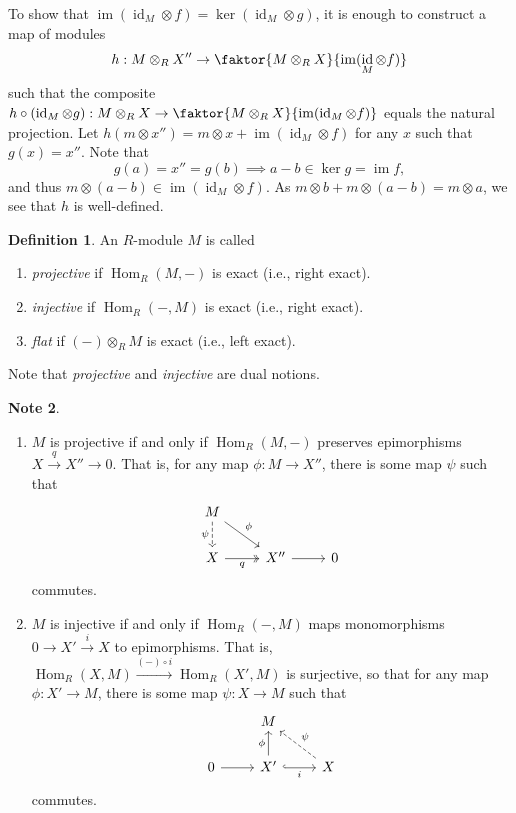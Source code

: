\documentclass[10pt,letterpaper,cm]{nupset}
\theoremstyle{definition}
\newtheorem{definition}{Definition}[subsection]
\newtheorem{note}[definition]{Note}
\theoremstyle{theorem}
\theoremstyle{remark}
\newcommand{\1}{\mathbf{1}}
\newcommand{\0}{\vec 0}
\DeclareMathOperator{\id}{\mathrm{id}}
\DeclareMathOperator{\im}{im}
\DeclareMathOperator{\Hom}{Hom}
\begin{document}
To show that $\im(\id_M \otimes f) = \ker(\id_M \otimes g)$, it is enough to construct a map of modules $$h: M \otimes_R X'' \to \faktor{M \otimes_R X}{\im(\id_M \otimes f)}$$ such that the composite $h\circ \left(\id_M \otimes g\right) : M\otimes_R X \to \faktor{M \otimes_R X}{\im(\id_M \otimes f)}$ equals the natural projection. Let $h(m\otimes x'') = m \otimes x + \im(\id_M \otimes f)$ for any $x$ such that $g(x) = x''$. Note that $$g(a) = x'' = g(b) \implies a-b \in \ker{g} = \im{f},$$ and thus $m \otimes (a-b) \in \im(\id_M \otimes f)$. As $m\otimes b + m \otimes (a-b) = m\otimes a$, we see that $h$ is well-defined.

\smallskip

\begin{definition} An $R$-module $M$ is called
\begin{enumerate}
\item \textit{projective} if $\Hom_R(M, -)$ is exact (i.e., right exact).
\item \textit{injective} if $\Hom_R(-, M)$ is exact (i.e., right exact).
\item \textit{flat} if $(-) \otimes_R M$ is exact (i.e., left exact).
\end{enumerate}
\end{definition}


Note that \textit{projective} and \textit{injective} are dual notions.


\begin{note} $ $
\begin{enumerate}
\item $M$ is projective  if and only if $\Hom_R(M, -)$ preserves epimorphisms $X \overset{q}{\longrightarrow}  X'' \to 0$. That is, for any map $\phi : M \to X''$, there is some map $\psi$ such that
\[
\begin{tikzcd}
M \arrow[rd, "\phi"] \arrow[d, "\psi"', dashed] &  &  \\
X \arrow[r, "q"', two heads] & X'' \arrow[r] & 0
\end{tikzcd}
\] commutes.
\item $M$ is injective  if and only if $\Hom_R(-, M)$ maps monomorphisms $0\to X' \overset{i}{\longrightarrow} X$ to epimorphisms. That is, $\Hom_R(X, M) \overset{(-) \circ i}{\longrightarrow} \Hom_R(X', M)$ is surjective, so that for any map $\phi : X' \to M$, there is some map $\psi : X \to M$ such that 
\[
\begin{tikzcd}
 & M &  \\
0 \arrow[r] & X' \arrow[r, "i"', hook] \arrow[u, "\phi"] & X \arrow[lu, "\psi"', dashed]
\end{tikzcd}
\] commutes.
\end{enumerate}
\end{note}
\end{document}
